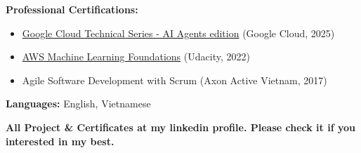 \documentclass[10pt,a4paper,ragged2e,withhyper]{altacv}
\begin{document}
\textbf{Professional Certifications:}
\begin{itemize}[leftmargin=*,noitemsep,topsep=0pt]
    \item \href{https://www.credential.net/f16b9afc-1d7a-4427-b7e3-f0bf76cd75ae}{Google Cloud Technical Series - AI Agents edition} (Google Cloud, 2025)
    \item \href{https://s3-us-west-2.amazonaws.com/udacity-printer/production/certificates/0ad10fbf-13db-4f96-b196-a108e3bff2b2.pdf}{AWS Machine Learning Foundations} (Udacity, 2022)
    \item Agile Software Development with Scrum (Axon Active Vietnam, 2017)
\end{itemize}

\smallskip
\textbf{Languages:} English, Vietnamese

\smallskip

\textbf{All Project \& Certificates at my linkedin profile. Please check it if you interested in my best.} 
\end{document}
